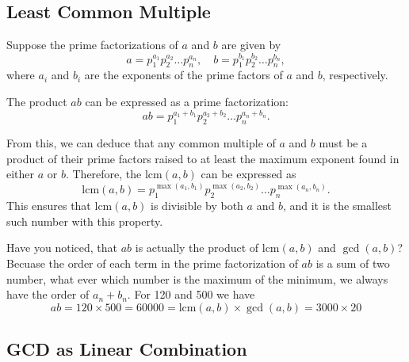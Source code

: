 \documentclass[oneside]{book}
\begin{document}
\subsection{Least Common Multiple}

Suppose the prime factorizations of \(a\) and \(b\) are given by
\[ a = p_1^{a_1} p_2^{a_2} \ldots p_n^{a_n}, \quad b = p_1^{b_1} p_2^{b_2} \ldots p_n^{b_n}, \]
where \(a_i\) and \(b_i\) are the exponents of the prime factors of \(a\) and \(b\), respectively.

The product \(ab\) can be expressed as a prime factorization:
\[ ab = p_1^{a_1+b_1} p_2^{a_2+b_2} \ldots p_n^{a_n+b_n}. \]

From this, we can deduce that any common multiple of \(a\) and \(b\) must be a product of their prime factors raised to at least the maximum exponent found in either \(a\) or \(b\). Therefore, the \(\text{lcm}(a, b)\) can be expressed as
\[ \text{lcm}(a, b) = p_1^{\max(a_1,b_1)} p_2^{\max(a_2,b_2)} \ldots p_n^{\max(a_n,b_n)}. \]
This ensures that \(\text{lcm}(a, b)\) is divisible by both \(a\) and \(b\), and it is the smallest such number with this property.



Have you noticed, that $ab$ is actually the product of $\text{lcm}(a,b)$ and $\gcd(a,b)$? Becuase the order of each
term in the prime factorization of $ab$ is a sum of two number, what ever which number is the maximum of the minimum,
we always have the order of $a_n+b_n$. For 120 and 500 we have
$$ab = 120\times 500 = 60000 = \text{lcm}(a,b)\times \gcd(a,b) = 3000\times 20$$



\subsection{GCD as Linear Combination}
\end{document}
